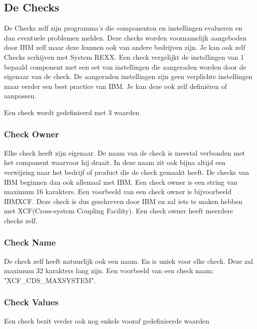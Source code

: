\subsection{De Checks}
\label{sec:z/OS Health Checker Checks}

De Checks zelf zijn programma's die componenten en instellingen evalueren en dan eventuele problemen melden. Deze checks worden voornamelijk aangeboden door IBM zelf maar deze kunnen ook van andere bedrijven zijn. Je kan ook zelf Checks scrhijven met System REXX. Een check vergelijkt de instellingen van 1 bepaald component met een set van instellingen die aangeraden worden door de eigenaar van de check. De aangeraden instellingen zijn geen verplichte instellingen maar eerder een best practice van IBM. Je kan deze ook zelf definiëren of aanpassen. \cite{Bezzi2010}

Een check wordt gedefinieerd met 3 waarden

\subsubsection{Check Owner}
\label{subsubsec:Check Owner}

Elke check heeft zijn eigenaar. De naam van de check is meestal verbonden met het component waarvoor hij draait. In deze naam zit ook bijna altijd een verwijzing naar het bedrijf of product die de check gemaakt heeft. De checks van IBM beginnen dan ook allemaal met IBM. Een check owner is een string van maximum 16 karakters. Een voorbeeld van een check owner is bijvoorbeeld IBMXCF. Deze check is dus geschreven door IBM en zal iets te maken hebben met XCF(Cross-system Coupling Facility). Een check owner heeft meerdere checks zelf. \cite{Bezzi2010}

\subsubsection{Check Name}
\label{subsubsec:Check Name}

De check zelf heeft natuurlijk ook een naam. En is uniek voor elke check. Deze zal maximum 32 karakters lang zijn. Een voorbeeld van een check naam: "XCF\_CDS\_MAXSYSTEM".

\subsubsection{Check Values}
\label{subsubsec:Check Values}

Een check bezit verder ook nog enkele vooraf gedefinieerde waarden

